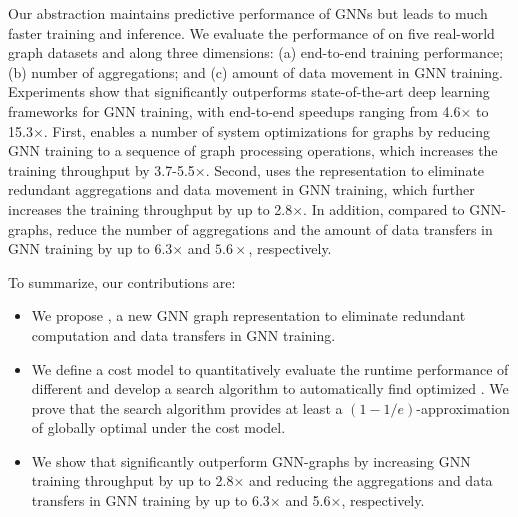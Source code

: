 Our \xg abstraction maintains predictive performance of GNNs but leads to much faster training and inference. We evaluate the performance of \sys on five real-world graph datasets and along three dimensions: (a) end-to-end training performance; (b) number of aggregations; and (c) amount of data movement in GNN training.
Experiments show that \sys significantly outperforms state-of-the-art deep learning frameworks for GNN training, with end-to-end speedups ranging from 4.6$\times$ to 15.3$\times$.
First, \sys enables a number of system optimizations for graphs by reducing GNN training to a sequence of graph processing operations, which increases the training throughput by 3.7-5.5$\times$. Second, \sys uses the \xg representation to eliminate redundant aggregations and data movement in GNN training, which further increases the training throughput by up to 2.8$\times$.
In addition, compared to GNN-graphs, \xgs reduce the number of aggregations and the amount of data transfers in GNN training by up to 6.3$\times$ and $5.6\times$, respectively.


To summarize, our contributions are: 
\begin{itemize}
    \setlength\itemsep{0em}
    \item We propose \xg, a new GNN graph representation to eliminate redundant computation and data transfers in GNN training.
    \item We define a cost model to quantitatively evaluate the runtime performance of different \xgs and develop a \xg search algorithm to automatically find optimized \xgs.
    We prove that the \xg search algorithm provides at least a $(1-1/e)$-approximation of globally optimal \xgs under the cost model.
    \item We show that \xgs significantly outperform GNN-graphs by increasing GNN training throughput by up to 2.8$\times$ and reducing the aggregations and data transfers in GNN training by up to 6.3$\times$ and 5.6$\times$, respectively.
\end{itemize}
